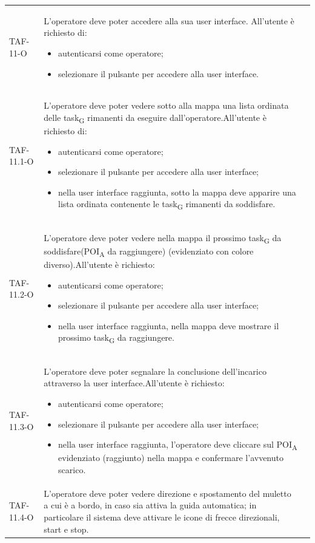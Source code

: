 \begin{longtable}{ >{\centering}p{} >{}p{}
		>{\centering}p{}}
	TAF-11-O & L'operatore deve poter accedere alla sua user interface. All'utente è richiesto di: \begin{itemize} \item autenticarsi come operatore; \item selezionare il pulsante per accedere alla user interface.\end{itemize} & 0\tabularnewline
	TAF-11.1-O & L'operatore deve poter vedere sotto alla mappa una lista ordinata delle task\textsubscript{G} rimanenti da eseguire dall'operatore.\newline All'utente è richiesto di: \begin{itemize} \item autenticarsi come operatore; \item selezionare il pulsante per accedere alla user interface; \item nella user interface raggiunta, sotto la mappa deve apparire una lista ordinata contenente le task\textsubscript{G} rimanenti da soddisfare.\end{itemize} & 0\tabularnewline
	TAF-11.2-O & L'operatore deve poter vedere nella mappa il prossimo task\textsubscript{G} da soddisfare(POI\textsubscript{A} da raggiungere) (evidenziato con colore diverso).\newline All'utente è richiesto: \begin{itemize} \item autenticarsi come operatore; \item selezionare il pulsante per accedere alla user interface; \item nella user interface raggiunta, nella mappa deve mostrare il prossimo task\textsubscript{G} da raggiungere.\end{itemize} & 0\tabularnewline
	TAF-11.3-O & L'operatore deve poter segnalare la conclusione dell'incarico attraverso la user interface.\newline All'utente è richiesto: \begin{itemize} \item autenticarsi come operatore; \item selezionare il pulsante per accedere alla user interface; \item nella user interface raggiunta, l'operatore deve cliccare sul POI\textsubscript{A} evidenziato (raggiunto) nella mappa e confermare l'avvenuto scarico.\end{itemize} & 0\tabularnewline
	TAF-11.4-O & L'operatore deve poter vedere direzione e spostamento del muletto a cui è a bordo, in caso sia attiva la guida automatica; in particolare il sistema deve attivare le icone di frecce direzionali, start e stop.  & 0\tabularnewline

\end{longtable}
